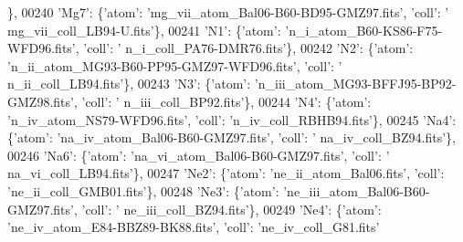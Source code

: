 \begin{DoxyCode}
      \},
00240                             \textcolor{stringliteral}{'Mg7'}: \{\textcolor{stringliteral}{'atom'}: \textcolor{stringliteral}{'mg\_vii\_atom\_Bal06-B60-BD95-GMZ97.fits'}, \textcolor{stringliteral}{'coll'}: \textcolor{stringliteral}{'
      mg\_vii\_coll\_LB94-U.fits'}\},
00241                             \textcolor{stringliteral}{'N1'}: \{\textcolor{stringliteral}{'atom'}: \textcolor{stringliteral}{'n\_i\_atom\_B60-KS86-F75-WFD96.fits'}, \textcolor{stringliteral}{'coll'}: \textcolor{stringliteral}{'
      n\_i\_coll\_PA76-DMR76.fits'}\},
00242                             \textcolor{stringliteral}{'N2'}: \{\textcolor{stringliteral}{'atom'}: \textcolor{stringliteral}{'n\_ii\_atom\_MG93-B60-PP95-GMZ97-WFD96.fits'}, \textcolor{stringliteral}{'coll'}: \textcolor{stringliteral}{'
      n\_ii\_coll\_LB94.fits'}\},
00243                             \textcolor{stringliteral}{'N3'}: \{\textcolor{stringliteral}{'atom'}: \textcolor{stringliteral}{'n\_iii\_atom\_MG93-BFFJ95-BP92-GMZ98.fits'}, \textcolor{stringliteral}{'coll'}: \textcolor{stringliteral}{'
      n\_iii\_coll\_BP92.fits'}\},
00244                             \textcolor{stringliteral}{'N4'}: \{\textcolor{stringliteral}{'atom'}: \textcolor{stringliteral}{'n\_iv\_atom\_NS79-WFD96.fits'}, \textcolor{stringliteral}{'coll'}: \textcolor{stringliteral}{'n\_iv\_coll\_RBHB94.fits'}\},
00245                             \textcolor{stringliteral}{'Na4'}: \{\textcolor{stringliteral}{'atom'}: \textcolor{stringliteral}{'na\_iv\_atom\_Bal06-B60-GMZ97.fits'}, \textcolor{stringliteral}{'coll'}: \textcolor{stringliteral}{'
      na\_iv\_coll\_BZ94.fits'}\},
00246                             \textcolor{stringliteral}{'Na6'}: \{\textcolor{stringliteral}{'atom'}: \textcolor{stringliteral}{'na\_vi\_atom\_Bal06-B60-GMZ97.fits'}, \textcolor{stringliteral}{'coll'}: \textcolor{stringliteral}{'
      na\_vi\_coll\_LB94.fits'}\},
00247                             \textcolor{stringliteral}{'Ne2'}: \{\textcolor{stringliteral}{'atom'}: \textcolor{stringliteral}{'ne\_ii\_atom\_Bal06.fits'}, \textcolor{stringliteral}{'coll'}: \textcolor{stringliteral}{'ne\_ii\_coll\_GMB01.fits'}\},
00248                             \textcolor{stringliteral}{'Ne3'}: \{\textcolor{stringliteral}{'atom'}: \textcolor{stringliteral}{'ne\_iii\_atom\_Bal06-B60-GMZ97.fits'}, \textcolor{stringliteral}{'coll'}: \textcolor{stringliteral}{'
      ne\_iii\_coll\_BZ94.fits'}\},
00249                             \textcolor{stringliteral}{'Ne4'}: \{\textcolor{stringliteral}{'atom'}: \textcolor{stringliteral}{'ne\_iv\_atom\_E84-BBZ89-BK88.fits'}, \textcolor{stringliteral}{'coll'}: \textcolor{stringliteral}{'ne\_iv\_coll\_G81.fits'}

\end{DoxyCode}
